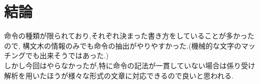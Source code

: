\documentclass[uplatex,a4j]{jsreport}
\begin{document}
\chapter{結論}
命令の種類が限られており,それぞれ決まった書き方をしていることが多かったので,
構文木の情報のみでも命令の抽出がやりやすかった.(機械的な文字のマッチングでも出来そうではあった.)\\
しかし今回はやらなかったが,特に命令の記法が一貫していない場合は係り受け解析を用いたほうが様々な形式の文章に対応できるので良いと思われる.

\end{document}
